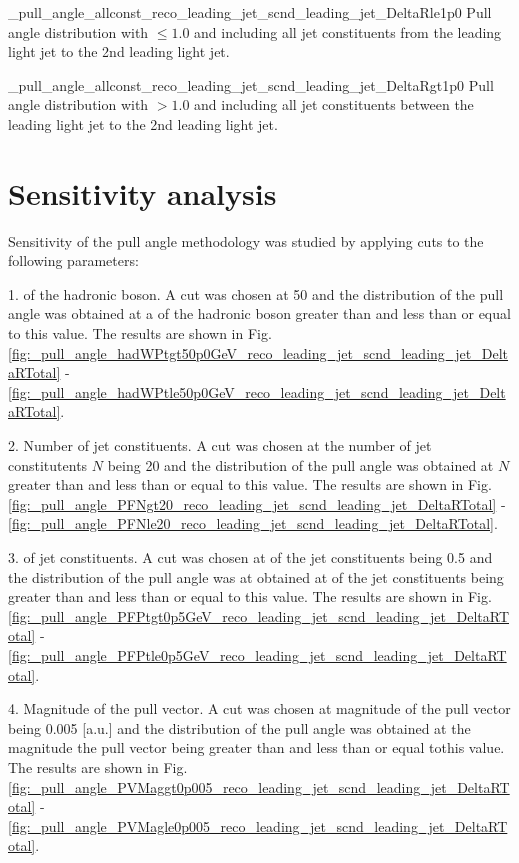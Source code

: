           {_pull_angle_allconst_reco_leading_jet_scnd_leading_jet_DeltaRle1p0}
          {Pull angle distribution with \DeltaR$\leq1.0$ and including all jet constituents from the leading light jet to the 2nd leading light jet.}

          {_pull_angle_allconst_reco_leading_jet_scnd_leading_jet_DeltaRgt1p0}
          {Pull angle distribution with \DeltaR$>1.0$ and including all jet constituents between the leading light jet to the 2nd leading light jet.}


\section{Sensitivity analysis}

Sensitivity of the pull angle methodology was studied by applying cuts to the following parameters:

1. \pt of the hadronic \PW boson. A cut was chosen at 50 \GeV and the distribution of the pull angle was obtained at a \pt of the hadronic \PW boson greater than and less than or equal to this value. The results are shown in Fig. \ref{fig:_pull_angle_hadWPtgt50p0GeV_reco_leading_jet_scnd_leading_jet_DeltaRTotal} - \ref{fig:_pull_angle_hadWPtle50p0GeV_reco_leading_jet_scnd_leading_jet_DeltaRTotal}.

2. Number of jet constituents. A cut was chosen at the number of jet constitutents $N$ being 20 and the distribution of the pull angle was obtained at $N$ greater than and less than or equal to this value. The results are shown in Fig. \ref{fig:_pull_angle_PFNgt20_reco_leading_jet_scnd_leading_jet_DeltaRTotal} - \ref{fig:_pull_angle_PFNle20_reco_leading_jet_scnd_leading_jet_DeltaRTotal}.
                                        
3. \pt of jet constituents. A cut was chosen at \pt of the jet constituents being 0.5 \GeV and the distribution of the pull angle was at obtained at \pt of the jet constituents being greater than and less than or equal to this value. The results are shown in Fig. \ref{fig:_pull_angle_PFPtgt0p5GeV_reco_leading_jet_scnd_leading_jet_DeltaRTotal} - \ref{fig:_pull_angle_PFPtle0p5GeV_reco_leading_jet_scnd_leading_jet_DeltaRTotal}.

4. Magnitude of the pull vector.  A cut was chosen at magnitude of the pull vector being 0.005 [a.u.] and the distribution of the pull angle was obtained at the magnitude the pull vector being greater than and less than or equal tothis value. The results are shown in Fig. \ref{fig:_pull_angle_PVMaggt0p005_reco_leading_jet_scnd_leading_jet_DeltaRTotal} - \ref{fig:_pull_angle_PVMagle0p005_reco_leading_jet_scnd_leading_jet_DeltaRTotal}.


